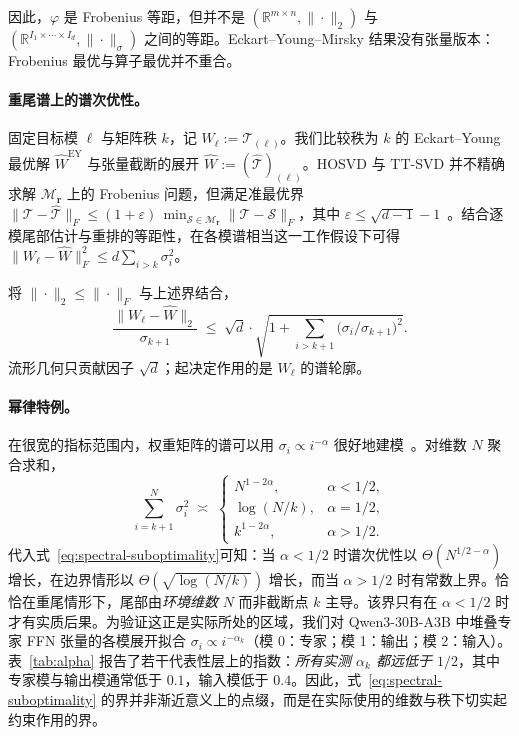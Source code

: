 因此，$\varphi$ 是 Frobenius 等距，但并不是 $(\mathbb{R}^{m \times n}, \|\cdot\|_2)$ 与 $(\mathbb{R}^{I_1 \times \cdots \times I_d}, \|\cdot\|_\sigma)$ 之间的等距。Eckart--Young--Mirsky 结果没有张量版本：Frobenius 最优与算子最优并不重合。

\paragraph{重尾谱上的谱次优性。} 固定目标模 $\ell$ 与矩阵秩 $k$，记 $W_\ell := \mathcal{T}_{(\ell)}$。我们比较秩为 $k$ 的 Eckart--Young 最优解 $\widehat{W}^{\mathrm{EY}}$ 与张量截断的展开 $\widehat{W} := (\widehat{\mathcal{T}})_{(\ell)}$。HOSVD 与 TT-SVD 并不精确求解 $\mathcal{M}_\mathbf{r}$ 上的 Frobenius 问题，但满足准最优界 $\|\mathcal{T} - \widehat{\mathcal{T}}\|_F \leq (1 + \varepsilon)\, \min_{\mathcal{S} \in \mathcal{M}_\mathbf{r}} \|\mathcal{T} - \mathcal{S}\|_F$，其中 $\varepsilon \leq \sqrt{d-1} - 1$~\citep{oseledets2011tensor}。结合逐模尾部估计与重排的等距性，在各模谱相当这一工作假设下可得 $\|W_\ell - \widehat{W}\|_F^2 \leq d \sum_{i > k} \sigma_i^2$。

\begin{corollary}
\label{cor:spectral-gap}
将 $\|\cdot\|_2 \leq \|\cdot\|_F$ 与上述界结合，
\begin{equation}
\frac{\|W_\ell - \widehat{W}\|_2}{\sigma_{k+1}} \;\leq\; \sqrt{d} \cdot \sqrt{1 + \!\!\sum_{i > k+1}\! \bigl(\sigma_i / \sigma_{k+1}\bigr)^2}.
\label{eq:spectral-suboptimality}
\end{equation}
流形几何只贡献因子 $\sqrt{d}$；起决定作用的是 $W_\ell$ 的谱轮廓。
\end{corollary}

\paragraph{幂律特例。}
在很宽的指标范围内，权重矩阵的谱可以用 $\sigma_i \propto i^{-\alpha}$ 很好地建模~\citep{martin2021implicit}。对维数 $N$ 聚合求和，
\begin{equation}
\sum_{i = k+1}^{N} \sigma_i^2 \;\asymp\; \begin{cases}
N^{1 - 2\alpha}, & \alpha < 1/2, \\
\log(N/k), & \alpha = 1/2, \\
k^{1 - 2\alpha}, & \alpha > 1/2.
\end{cases}
\label{eq:power-law-tail}
\end{equation}
代入式~\eqref{eq:spectral-suboptimality}可知：当 $\alpha < 1/2$ 时谱次优性以 $\Theta(N^{1/2 - \alpha})$ 增长，在边界情形以 $\Theta(\sqrt{\log(N/k)})$ 增长，而当 $\alpha > 1/2$ 时有常数上界。恰恰在重尾情形下，尾部由\emph{环境维数} $N$ 而非截断点 $k$ 主导。该界只有在 $\alpha < 1/2$ 时才有实质后果。为验证这正是实际所处的区域，我们对 Qwen3-30B-A3B 中堆叠专家 FFN 张量的各模展开拟合 $\sigma_i \propto i^{-\alpha_k}$（模 0：专家；模 1：输出；模 2：输入）。表~\ref{tab:alpha} 报告了若干代表性层上的指数：\emph{所有实测 $\alpha_k$ 都远低于 $1/2$}，其中专家模与输出模通常低于 $0.1$，输入模低于 $0.4$。因此，式~\eqref{eq:spectral-suboptimality} 的界并非渐近意义上的点缀，而是在实际使用的维数与秩下切实起约束作用的界。


